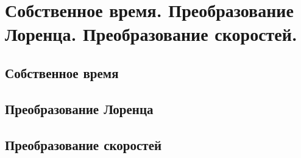 \chapter{Собственное время. Преобразование Лоренца. Преобразование 
скоростей.}

\section{Собственное время}
\section{Преобразование Лоренца}
\section{Преобразование скоростей}

